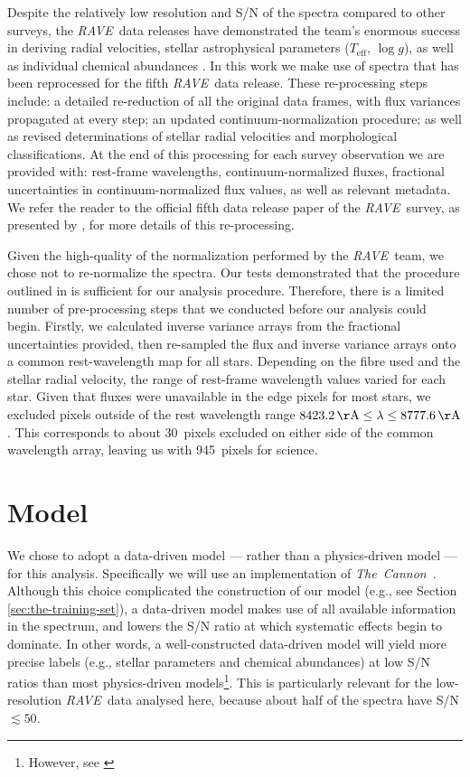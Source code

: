 \documentclass[preprint,trackchanges]{aastex}
\newcommand{\project}[1]{\textsl{#1}}
\newcommand{\thecannon}{\project{The~Cannon}}
\newcommand{\acronym}[1]{{\small{#1}}}
\newcommand{\rave}{\project{\acronym{RAVE}}}
\newcommand{\logg}{\log g}
\newcommand{\teff}{T_{\mathrm{eff}}}
\begin{document}
Despite the relatively low resolution and S/N of the spectra compared to other
surveys, the \rave\ data releases have demonstrated the team's enormous success 
in deriving radial velocities, stellar astrophysical parameters ($\teff$, $\logg$),
as well as individual chemical abundances \citep{Steinmetz_2006,Zwitter_2008,
Siebert_2011,Kordopatis_2013, Kunder_2016}.  In this work we make use of spectra
that has been reprocessed for the fifth \rave\ data release.  These re-processing
steps include: a detailed re-reduction of all the original data frames, with flux
variances propagated at every step; an updated continuum-normalization procedure;
as well as revised determinations of stellar radial velocities and morphological
classifications. At the end of this processing for each survey observation we are 
provided with: rest-frame wavelengths, continuum-normalized fluxes, fractional 
uncertainties in continuum-normalized flux values, as well as relevant metadata.  
We refer the reader to the official fifth data release paper of the \rave\ survey, 
as presented by \citet{Kunder_2016}, for more details of this re-processing.


Given the high-quality of the normalization performed by the \rave\ team, we chose
not to re-normalize the spectra.  Our tests demonstrated that the procedure 
outlined in \citet{Kunder_2016} is sufficient for our analysis procedure. Therefore,
there is a limited number of pre-processing steps that we conducted before our
analysis could begin.  Firstly, we calculated inverse variance arrays from the
fractional uncertainties provided, then re-sampled the flux and inverse variance
arrays onto a common rest-wavelength map for all stars.  Depending on the fibre 
used and the stellar radial velocity, the range of rest-frame wavelength values
varied for each star.  Given that fluxes were unavailable in the edge pixels for 
most stars, we excluded pixels outside of the rest wavelength range 
$8423.2\,{\rm \AA} \le \lambda \le 8777.6\,{\rm \AA}$.  This corresponds to about
30~pixels excluded on either side of the common wavelength array, leaving us with
945~pixels for science.


\section{Model}
\label{sec:model}

We chose to adopt a data-driven model --- rather than a physics-driven model ---
for this analysis.  Specifically we will use an implementation of \thecannon\
\citep{Ness_2015,Ness_2016}.  Although this choice complicated the construction 
of our model (e.g., see Section \ref{sec:the-training-set}), a data-driven model 
makes use of all available information in the spectrum, and lowers the S/N ratio 
at which systematic effects begin to dominate.  In other words, a well-constructed
data-driven model will yield more precise labels (e.g., stellar parameters and
chemical abundances) at low S/N ratios than most physics-driven models\footnote{
However, see \citet{Casey_2016a}}.  This is particularly relevant for the 
low-resolution \rave\ data analysed here, because about half of the spectra have
S/N $\lesssim 50$. 
\end{document}
